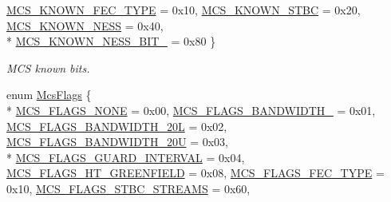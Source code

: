 \begin{DoxyCompactItemize}
\hyperlink{classns3_1_1RadiotapHeader_aac7ef91c429fa95640a0e3a996b6741da15967fe34f7c63675c058d2832524c95}{M\+C\+S\+\_\+\+K\+N\+O\+W\+N\+\_\+\+F\+E\+C\+\_\+\+T\+Y\+PE} = 0x10, 
\hyperlink{classns3_1_1RadiotapHeader_aac7ef91c429fa95640a0e3a996b6741dafe3d106f243f1230cedd23df369445f9}{M\+C\+S\+\_\+\+K\+N\+O\+W\+N\+\_\+\+S\+T\+BC} = 0x20, 
\hyperlink{classns3_1_1RadiotapHeader_aac7ef91c429fa95640a0e3a996b6741da96922c704ba99acf6c306c79f89f02ff}{M\+C\+S\+\_\+\+K\+N\+O\+W\+N\+\_\+\+N\+E\+SS} = 0x40, 
\\*
\hyperlink{classns3_1_1RadiotapHeader_aac7ef91c429fa95640a0e3a996b6741da84245044e52f4f408a0001fb908caefa}{M\+C\+S\+\_\+\+K\+N\+O\+W\+N\+\_\+\+N\+E\+S\+S\+\_\+\+B\+I\+T\+\_} = 0x80
 \}\begin{DoxyCompactList}\small\item\em M\+CS known bits. \end{DoxyCompactList}
\item 
enum \hyperlink{classns3_1_1RadiotapHeader_a81a58a7c4281df7ce21fb72c5ed181c3}{Mcs\+Flags} \{ \\*
\hyperlink{classns3_1_1RadiotapHeader_a81a58a7c4281df7ce21fb72c5ed181c3a67178ec6513d916afcecb853ff28879a}{M\+C\+S\+\_\+\+F\+L\+A\+G\+S\+\_\+\+N\+O\+NE} = 0x00, 
\hyperlink{classns3_1_1RadiotapHeader_a81a58a7c4281df7ce21fb72c5ed181c3ab773f6bda0fb799641002df6fa7999b3}{M\+C\+S\+\_\+\+F\+L\+A\+G\+S\+\_\+\+B\+A\+N\+D\+W\+I\+D\+T\+H\+\_} = 0x01, 
\hyperlink{classns3_1_1RadiotapHeader_a81a58a7c4281df7ce21fb72c5ed181c3a41b3a5b0829e5d74481b29e10bb9b62b}{M\+C\+S\+\_\+\+F\+L\+A\+G\+S\+\_\+\+B\+A\+N\+D\+W\+I\+D\+T\+H\+\_\+20L} = 0x02, 
\hyperlink{classns3_1_1RadiotapHeader_a81a58a7c4281df7ce21fb72c5ed181c3af81c202c7a382ad9aef708cf2ce35fc3}{M\+C\+S\+\_\+\+F\+L\+A\+G\+S\+\_\+\+B\+A\+N\+D\+W\+I\+D\+T\+H\+\_\+20U} = 0x03, 
\\*
\hyperlink{classns3_1_1RadiotapHeader_a81a58a7c4281df7ce21fb72c5ed181c3acc0e1e46ecea2243688341d5aa31fbb1}{M\+C\+S\+\_\+\+F\+L\+A\+G\+S\+\_\+\+G\+U\+A\+R\+D\+\_\+\+I\+N\+T\+E\+R\+V\+AL} = 0x04, 
\hyperlink{classns3_1_1RadiotapHeader_a81a58a7c4281df7ce21fb72c5ed181c3ac8c45b1a0c60f92bf2f424f46373c87c}{M\+C\+S\+\_\+\+F\+L\+A\+G\+S\+\_\+\+H\+T\+\_\+\+G\+R\+E\+E\+N\+F\+I\+E\+LD} = 0x08, 
\hyperlink{classns3_1_1RadiotapHeader_a81a58a7c4281df7ce21fb72c5ed181c3aaed90d8ffcd9188b689b67d64d24d7dc}{M\+C\+S\+\_\+\+F\+L\+A\+G\+S\+\_\+\+F\+E\+C\+\_\+\+T\+Y\+PE} = 0x10, 
\hyperlink{classns3_1_1RadiotapHeader_a81a58a7c4281df7ce21fb72c5ed181c3a9d8a68f5220ee2e53e48ebb9f140103b}{M\+C\+S\+\_\+\+F\+L\+A\+G\+S\+\_\+\+S\+T\+B\+C\+\_\+\+S\+T\+R\+E\+A\+MS} = 0x60, 

\end{DoxyCompactItemize}
